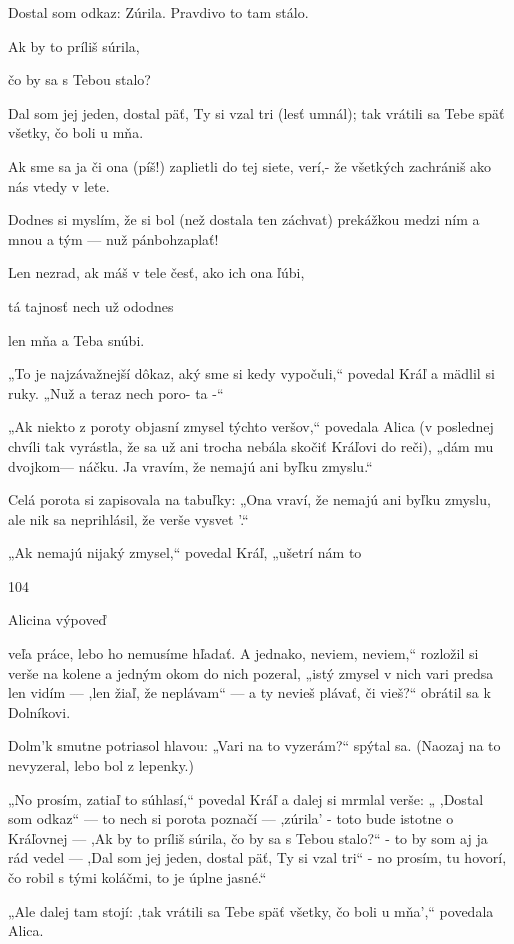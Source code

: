 \documentclass[12pt]{book}
\begin{document}
\begin{Parallel}[p]{}{}
{Dostal som odkaz: Zúrila.
Pravdivo to tam stálo.

Ak by to príliš súrila,

čo by sa s Tebou stalo?

Dal som jej jeden, dostal päť,
Ty si vzal tri (lesť umnál);
tak vrátili sa Tebe späť
všetky, čo boli u mňa.

 

Ak sme sa ja či ona (píš!)
zaplietli do tej siete,
verí,- že všetkých zachrániš
ako nás vtedy v lete.

Dodnes si myslím, že si bol
(než dostala ten záchvat)
prekážkou medzi ním a mnou
a tým — nuž pánbohzaplať!

Len nezrad, ak máš v tele česť,
ako ich ona ľúbi,

tá tajnosť nech už ododnes

len mňa a Teba snúbi.

„To je najzávažnejší dôkaz, aký sme si kedy vypočuli,“
povedal Kráľ a mädlil si ruky. „Nuž a teraz nech poro-
ta -“

„Ak niekto z poroty objasní zmysel týchto veršov,“
povedala Alica (v poslednej chvíli tak vyrástla, že sa už ani
trocha nebála skočiť Kráľovi do reči), „dám mu dvojkom—
náčku. Ja vravím, že nemajú ani byľku zmyslu.“

Celá porota si zapisovala na tabuľky: „Ona vraví, že
nemajú ani byľku zmyslu, ale nik sa neprihlásil, že verše
vysvet '.“

„Ak nemajú nijaký zmysel,“ povedal Kráľ, „ušetrí nám to

104

Alicina výpoveď

veľa práce, lebo ho nemusíme hľadať. A jednako, neviem,
neviem,“ rozložil si verše na kolene a jedným okom do nich
pozeral, „istý zmysel v nich vari predsa len vidím — ,len žiaľ,
že neplávam“ — a ty nevieš plávať, či vieš?“ obrátil sa
k Dolníkovi.

Dolm'k smutne potriasol hlavou: „Vari na to vyzerám?“
spýtal sa. (Naozaj na to nevyzeral, lebo bol z lepenky.)

„No prosím, zatiaľ to súhlasí,“ povedal Kráľ a dalej si
mrmlal verše: „ ,Dostal som odkaz“ — to nech si porota
poznačí — ,zúrila' - toto bude istotne o Kráľovnej — ,Ak by
to príliš súrila, čo by sa s Tebou stalo?“ - to by som aj ja rád
vedel — ,Dal som jej jeden, dostal päť, Ty si vzal tri“ - no
prosím, tu hovorí, čo robil s tými koláčmi, to je úplne
jasné.“

„Ale dalej tam stojí: ,tak vrátili sa Tebe späť všetky, čo
boli u mňa',“ povedala Alica.

}
\end{Parallel}
\end{document}
